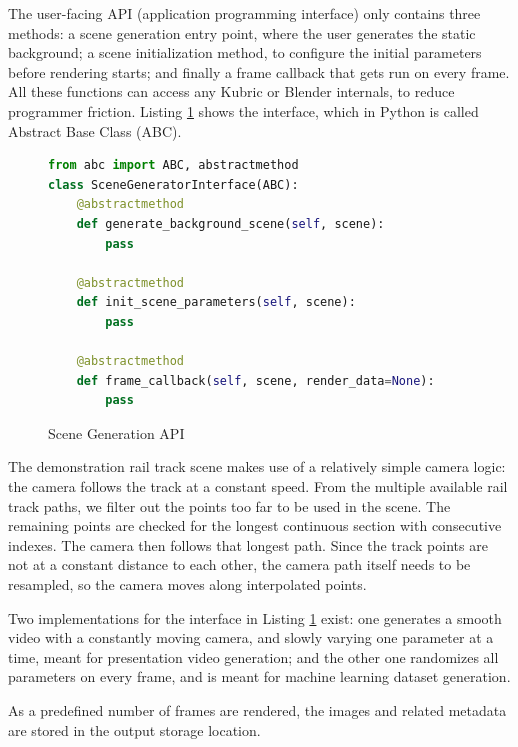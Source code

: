The user-facing API (application programming interface) only contains three methods: a scene generation entry point, where the user generates the static background; a scene initialization method, to configure the initial parameters before rendering starts; and finally a frame callback that gets run on every frame. All these functions can access any Kubric or Blender internals, to reduce programmer friction. Listing \ref{fig:api-scene-generation} shows the interface, which in Python is called Abstract Base Class (ABC).

\begin{figure}[H]
\begin{lstlisting}[language=python]
from abc import ABC, abstractmethod
class SceneGeneratorInterface(ABC):
    @abstractmethod
    def generate_background_scene(self, scene):
        pass
        
    @abstractmethod
    def init_scene_parameters(self, scene):
        pass
        
    @abstractmethod
    def frame_callback(self, scene, render_data=None):
        pass
\end{lstlisting}
\caption{Scene Generation API}
\label{fig:api-scene-generation}
\end{figure}

The demonstration rail track scene makes use of a relatively simple camera logic: the camera follows the track at a constant speed. From the multiple available rail track paths, we filter out the points too far to be used in the scene. The remaining points are checked for the longest continuous section with consecutive indexes. The camera then follows that longest path. Since the track points are not at a constant distance to each other, the camera path itself needs to be resampled, so the camera moves along interpolated points.

Two implementations for the interface in Listing \ref{fig:api-scene-generation} exist: one generates a smooth video with a constantly moving camera, and slowly varying  one parameter at a time, meant for presentation video generation; and the other one randomizes all parameters on every frame, and is meant for machine learning dataset generation.

As a predefined number of frames are rendered, the images and related metadata are stored in the output storage location.
